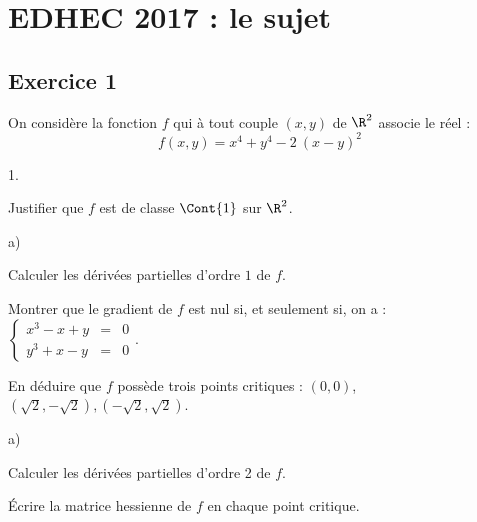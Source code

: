 \chapter*{EDHEC 2017 : le sujet}
  
%

\section*{Exercice 1}

\noindent
On considère la fonction $f$ qui à tout couple $(x,y)$ de $\R^{2}$
associe le réel :
\[
f(x,y) = x^{4} + y^{4} - 2 \ (x-y)^{2}
\]
\begin{noliste}{1.}
  \setlength{\itemsep}{4mm}
\item Justifier que $f$ est de classe $\Cont{1}$ sur $\R^{2}$.

  

\item
  \begin{noliste}{a)}
    \setlength{\itemsep}{2mm}
  \item Calculer les dérivées partielles d'ordre $1$ de $f$.

    

  \item Montrer que le gradient de $f$ est nul si, et seulement si, on
    a : $ \left\{
      \begin{array}{rcl}
        x^{3}-x + y & = & 0 \\
        y^{3} + x-y & = & 0
      \end{array}
    \right.$.

    

  \item En déduire que $f$ possède trois points critiques : $(0,0)$,
    $(\sqrt{2},-\sqrt{2}), (-\sqrt{2},\sqrt{2})$.

    
  \end{noliste}




\item
  \begin{noliste}{a)}
    \setlength{\itemsep}{2mm}
  \item Calculer les dérivées partielles d'ordre 2 de $f$.

    

  \item Écrire la matrice hessienne de $f$ en chaque point critique.

    
    




\end{noliste}
\end{noliste}
